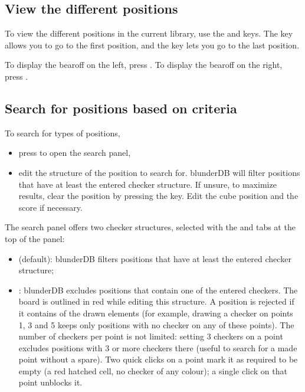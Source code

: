 \documentclass[letterpaper,10pt,english]{sphinxmanual}
\begin{document}
\subsection{View the different positions}
\label{\detokenize{guide_utilisateur:visualiser-les-differentes-positions}}
\sphinxAtStartPar
To view the different positions in the current library, use the  and  keys. The  key allows you to go to the first position, and the  key lets you go to the last position.

\sphinxAtStartPar
To display the bearoff on the left, press . To display the bearoff on the right, press .


\subsection{Search for positions based on criteria}
\label{\detokenize{guide_utilisateur:rechercher-des-positions-selon-des-criteres}}
\sphinxAtStartPar
To search for types of positions,
\begin{itemize}
\item {} 
\sphinxAtStartPar
press  to open the search panel,

\item {} 
\sphinxAtStartPar
edit the structure of the position to search for. blunderDB will filter positions that have at least the entered checker structure. If unsure, to maximize results, clear the position by pressing the  key. Edit the cube position and the score if necessary.

\end{itemize}

\sphinxAtStartPar
The search panel offers two checker structures, selected with the  and  tabs at the top of the panel:
\begin{itemize}
\item {} 
\sphinxAtStartPar
{} (default): blunderDB filters positions that have at least the entered checker structure;

\item {} 
\sphinxAtStartPar
{}: blunderDB excludes positions that contain one of the entered checkers. The board is outlined in red while editing this structure. A position is rejected if it contains  of the drawn elements (for example, drawing a checker on points 1, 3 and 5 keeps only positions with no checker on any of these points). The number of checkers per point is not limited: setting 3 checkers on a point excludes positions with 3 or more checkers there (useful to search for a made point without a spare). Two quick clicks on a point mark it as required to be empty (a red hatched cell, no checker of any colour); a single click on that point unblocks it.

\end{itemize}
\end{document}
